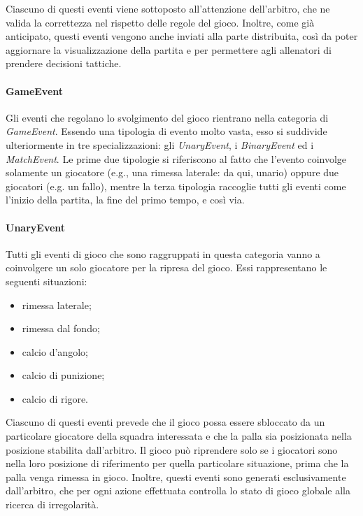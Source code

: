 Ciascuno di questi eventi viene sottoposto all'attenzione dell'arbitro, che ne valida la correttezza nel rispetto delle regole del gioco. Inoltre, come già anticipato, questi eventi vengono anche inviati alla parte distribuita, così da poter aggiornare la visualizzazione della partita e per permettere agli allenatori di prendere decisioni tattiche.

\paragraph{GameEvent} Gli eventi che regolano lo svolgimento del gioco rientrano nella categoria di \textit{GameEvent}. Essendo una tipologia di evento molto vasta, esso si suddivide ulteriormente in tre specializzazioni: gli \textit{UnaryEvent}, i \textit{BinaryEvent} ed i \textit{MatchEvent}. Le prime due tipologie si riferiscono al fatto che l'evento coinvolge solamente un giocatore (e.g., una rimessa laterale: da qui, unario) oppure due giocatori (e.g. un fallo), mentre la terza tipologia raccoglie tutti gli eventi come l'inizio della partita, la fine del primo tempo, e così via.\\

\paragraph{UnaryEvent} Tutti gli eventi di gioco che sono raggruppati in questa categoria vanno a coinvolgere un solo giocatore per la ripresa del gioco. Essi rappresentano le seguenti situazioni:

\begin{itemize}
	\item rimessa laterale;
	\item rimessa dal fondo;
	\item calcio d'angolo;
	\item calcio di punizione;
	\item calcio di rigore.
\end{itemize}

Ciascuno di questi eventi prevede che il gioco possa essere sbloccato da un particolare giocatore della squadra interessata e che la palla sia posizionata nella posizione stabilita dall'arbitro. Il gioco può riprendere solo se i giocatori sono nella loro posizione di riferimento per quella particolare situazione, prima che la palla venga rimessa in gioco. Inoltre, questi eventi sono generati esclusivamente dall'arbitro, che per ogni azione effettuata controlla lo stato di gioco globale alla ricerca di irregolarità.

